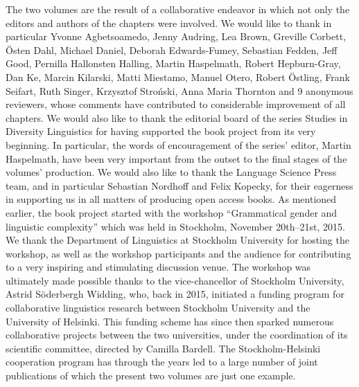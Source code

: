 \documentclass[output=collectionpaper]{langsci/langscibook}
\begin{document}
The two volumes are the result of a collaborative endeavor in which not only the editors and authors of the chapters were involved. We would like to thank in particular Yvonne Agbetsoamedo, Jenny Audring, Lea Brown, Greville Corbett, Östen Dahl, Michael Daniel, Deborah Edwards-Fumey, Sebastian Fedden, Jeff Good, Pernilla Hallonsten Halling, Martin Haspelmath, Robert Hepburn-Gray, Dan Ke, Marcin Kilarski, Matti Miestamo, Manuel Otero, Robert Östling, Frank Seifart, Ruth Singer, Krzysztof Stroński, Anna Maria Thornton and 9 anonymous reviewers, whose comments have contributed to considerable improvement of all chapters. We would also like to thank the editorial board of the series Studies in Diversity Linguistics for having supported the book project from its very beginning. In particular, the words of encouragement of the series’ editor, Martin Haspelmath, have been very important from the outset to the final stages of the volumes’ production. We would also like to thank the Language Science Press team, and in particular Sebastian Nordhoff and Felix Kopecky, for their eagerness in supporting us in all matters of producing open access books. As mentioned earlier, the book project started with the workshop ``Grammatical gender and linguistic complexity'' which was held in Stockholm, November 20th--21st, 2015. We thank the Department of Linguistics at Stockholm University for hosting the workshop, as well as the workshop participants and the audience for contributing to a very inspiring and stimulating discussion venue. The workshop was ultimately made possible thanks to the vice-chancellor of Stockholm University, Astrid Söderbergh Widding, who, back in 2015, initiated a funding program for collaborative linguistics research between Stockholm University and the University of Helsinki. This funding scheme has since then sparked numerous collaborative projects between the two universities, under the coordination of its scientific committee, directed by Camilla Bardell. The Stockholm-Helsinki cooperation program has through the years led to a large number of joint publications of which the present two volumes are just one example.

{\sloppy
\printbibliography[heading=subbibliography,notkeyword=this]
}
\end{document}
